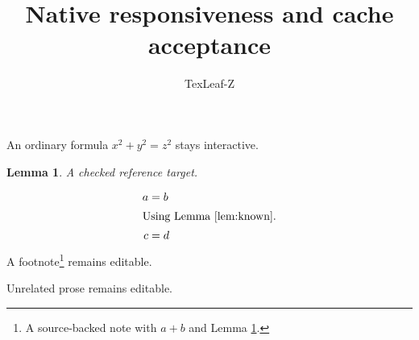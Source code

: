 \documentclass{article}
\title{Native responsiveness and cache acceptance}
\author{TexLeaf-Z}
\newtheorem{lemma}{Lemma}
\begin{document}
\maketitle
An ordinary formula $x^2+y^2=z^2$ stays interactive.
\begin{lemma}\label{lem:known}A checked reference target.\end{lemma}
\begin{align*}a&=b\\\intertext{Using Lemma \ref{lem:known}.}c&=d\end{align*}
A footnote\footnote{A source-backed note with $a+b$ and Lemma \ref{lem:known}.} remains editable.
Unrelated prose remains editable.
\end{document}

